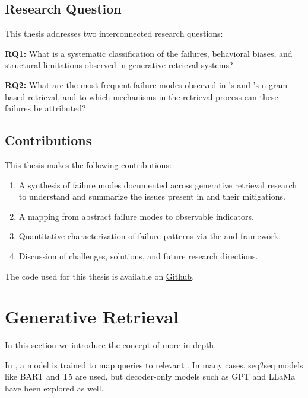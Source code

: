 \subsection{Research Question}

This thesis addresses two interconnected research questions:

\textbf{RQ1:} What is a systematic classification of the failures, behavioral biases, and structural limitations observed in generative retrieval systems?

\textbf{RQ2:} What are the most frequent failure modes observed in 's and 's n-gram-based retrieval, and to which mechanisms in the retrieval process can these failures be attributed?

\subsection{Contributions}

This thesis makes the following contributions:

\begin{enumerate}
    \item A synthesis of failure modes documented across generative retrieval research to understand and summarize the issues present in  and their mitigations.
    \item A mapping from abstract failure modes to observable indicators.
    \item Quantitative characterization of failure patterns via the  and  framework.
    \item Discussion of  challenges, solutions, and future research directions.


\end{enumerate}
The code used for this thesis is available on \href{https://github.com/richietk/thesis}{Github}.


\pagebreak

\section{Generative Retrieval}

In this section we introduce the concept of  more in depth. 

In , a model is trained to map queries to relevant . In many cases, seq2seq models like BART \cite{lewis-bart-denoising} and T5 \cite{colin-raffel-exploring-the} are used, but decoder-only models such as GPT \cite{alec-radford-improving-language} and LLaMa \cite{aaron-grattafiori-the-llama} have been explored as well. %


